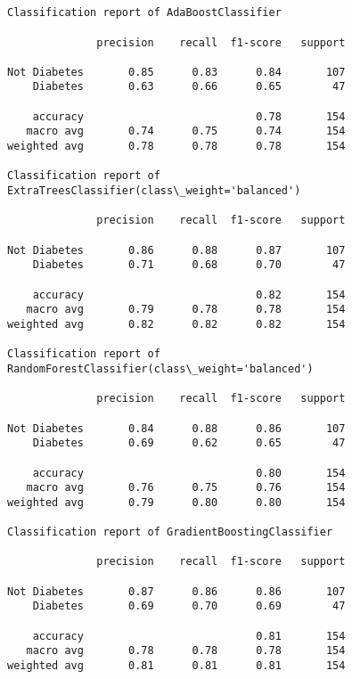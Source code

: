 \documentclass[11pt]{article}
\begin{document}
    \begin{center}
    \end{center}
    { \hspace*{\fill} \\}
    
    \begin{center}
    \end{center}
    { \hspace*{\fill} \\}
    
    \begin{Verbatim}[commandchars=\\\{\}]
Classification report of AdaBoostClassifier

              precision    recall  f1-score   support

Not Diabetes       0.85      0.83      0.84       107
    Diabetes       0.63      0.66      0.65        47

    accuracy                           0.78       154
   macro avg       0.74      0.75      0.74       154
weighted avg       0.78      0.78      0.78       154

Classification report of ExtraTreesClassifier(class\_weight='balanced')

              precision    recall  f1-score   support

Not Diabetes       0.86      0.88      0.87       107
    Diabetes       0.71      0.68      0.70        47

    accuracy                           0.82       154
   macro avg       0.79      0.78      0.78       154
weighted avg       0.82      0.82      0.82       154

Classification report of RandomForestClassifier(class\_weight='balanced')

              precision    recall  f1-score   support

Not Diabetes       0.84      0.88      0.86       107
    Diabetes       0.69      0.62      0.65        47

    accuracy                           0.80       154
   macro avg       0.76      0.75      0.76       154
weighted avg       0.79      0.80      0.80       154

Classification report of GradientBoostingClassifier

              precision    recall  f1-score   support

Not Diabetes       0.87      0.86      0.86       107
    Diabetes       0.69      0.70      0.69        47

    accuracy                           0.81       154
   macro avg       0.78      0.78      0.78       154
weighted avg       0.81      0.81      0.81       154

    \end{Verbatim}
\end{document}
